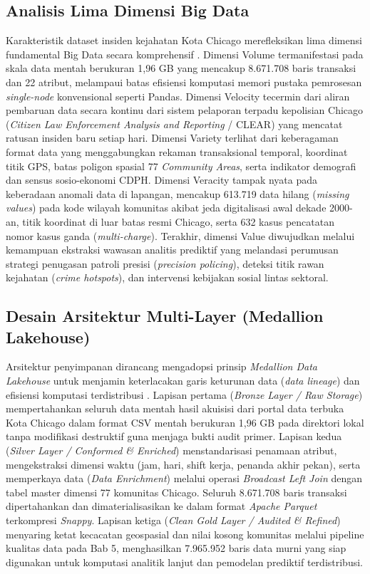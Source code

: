 \documentclass[11pt,a4paper]{article}
\begin{document}
\subsection{Analisis Lima Dimensi Big Data}
Karakteristik dataset insiden kejahatan Kota Chicago merefleksikan lima dimensi fundamental Big Data secara komprehensif \cite{zaharia2012}. Dimensi Volume termanifestasi pada skala data mentah berukuran 1,96 GB yang mencakup 8.671.708 baris transaksi dan 22 atribut, melampaui batas efisiensi komputasi memori pustaka pemrosesan \textit{single-node} konvensional seperti Pandas. Dimensi Velocity tecermin dari aliran pembaruan data secara kontinu dari sistem pelaporan terpadu kepolisian Chicago (\textit{Citizen Law Enforcement Analysis and Reporting} / CLEAR) yang mencatat ratusan insiden baru setiap hari. Dimensi Variety terlihat dari keberagaman format data yang menggabungkan rekaman transaksional temporal, koordinat titik GPS, batas poligon spasial 77 \textit{Community Areas}, serta indikator demografi dan sensus sosio-ekonomi CDPH. Dimensi Veracity tampak nyata pada keberadaan anomali data di lapangan, mencakup 613.719 data hilang (\textit{missing values}) pada kode wilayah komunitas akibat jeda digitalisasi awal dekade 2000-an, titik koordinat di luar batas resmi Chicago, serta 632 kasus pencatatan nomor kasus ganda (\textit{multi-charge}). Terakhir, dimensi Value diwujudkan melalui kemampuan ekstraksi wawasan analitis prediktif yang melandasi perumusan strategi penugasan patroli presisi (\textit{precision policing}), deteksi titik rawan kejahatan (\textit{crime hotspots}), dan intervensi kebijakan sosial lintas sektoral.

\subsection{Desain Arsitektur Multi-Layer (Medallion Lakehouse)}
Arsitektur penyimpanan dirancang mengadopsi prinsip \textit{Medallion Data Lakehouse} untuk menjamin keterlacakan garis keturunan data (\textit{data lineage}) dan efisiensi komputasi terdistribusi \cite{zaharia2012}. Lapisan pertama (\textit{Bronze Layer / Raw Storage}) mempertahankan seluruh data mentah hasil akuisisi dari portal data terbuka Kota Chicago dalam format CSV mentah berukuran 1,96 GB pada direktori lokal tanpa modifikasi destruktif guna menjaga bukti audit primer. Lapisan kedua (\textit{Silver Layer / Conformed \& Enriched}) menstandarisasi penamaan atribut, mengekstraksi dimensi waktu (jam, hari, shift kerja, penanda akhir pekan), serta memperkaya data (\textit{Data Enrichment}) melalui operasi \textit{Broadcast Left Join} dengan tabel master dimensi 77 komunitas Chicago. Seluruh 8.671.708 baris transaksi dipertahankan dan dimaterialisasikan ke dalam format \textit{Apache Parquet} terkompresi \textit{Snappy}. Lapisan ketiga (\textit{Clean Gold Layer / Audited \& Refined}) menyaring ketat kecacatan geospasial dan nilai kosong komunitas melalui pipeline kualitas data pada Bab 5, menghasilkan 7.965.952 baris data murni yang siap digunakan untuk komputasi analitik lanjut dan pemodelan prediktif terdistribusi.
\end{document}
